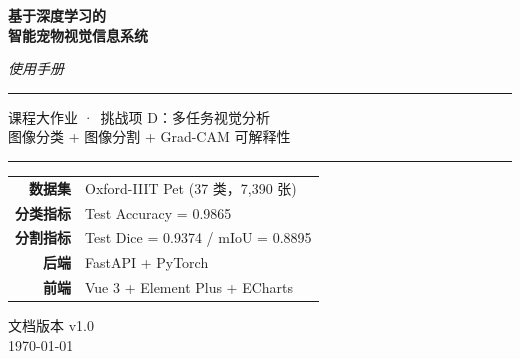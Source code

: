 \documentclass[12pt, a4paper, openany]{ctexbook}
\begin{document}
\begin{titlepage}
  \centering
  \vspace*{2cm}

  {\Huge\bfseries 基于深度学习的\\[0.3cm] 智能宠物视觉信息系统 \par}
  \vspace{0.5cm}
  {\Large\itshape 使用手册 \par}

  \vspace{1.5cm}

  \rule{\linewidth}{0.5mm}
  \vspace{0.4cm}

  {\large
    课程大作业 ·\ 挑战项 D：多任务视觉分析 \\[0.4cm]
    图像分类 + 图像分割 + Grad-CAM 可解释性
  }

  \vspace{0.4cm}
  \rule{\linewidth}{0.5mm}

  \vspace{2cm}

  \begin{center}
    \begin{tabular}{rl}
      \textbf{数据集}    & Oxford-IIIT Pet (37 类，7{,}390 张) \\
      \textbf{分类指标}  & Test Accuracy = 0.9865 \\
      \textbf{分割指标}  & Test Dice = 0.9374 / mIoU = 0.8895 \\
      \textbf{后端}      & FastAPI + PyTorch \\
      \textbf{前端}      & Vue 3 + Element Plus + ECharts \\
    \end{tabular}
  \end{center}

  \vfill
  {\large 文档版本 v1.0 \\[0.2cm] \today \par}
\end{titlepage}

\tableofcontents
\thispagestyle{empty}
\cleardoublepage

\setcounter{page}{1}

\end{document}
